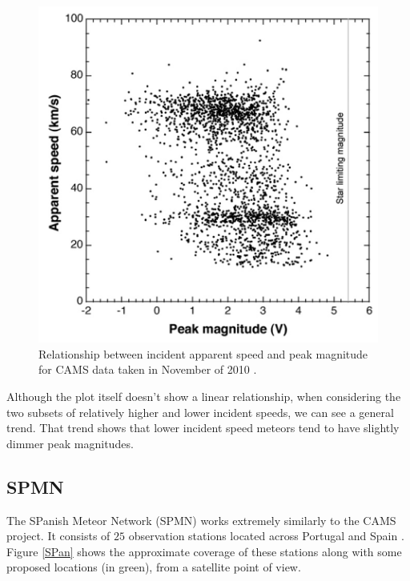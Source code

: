 \begin{figure}[ht!]
  \centering
  \includegraphics[scale=0.6]{images/CAMS_plot.png}
  \caption{Relationship between incident apparent speed and peak magnitude for CAMS data taken in November of 2010 \cite{jenniskens_cams:_2011}.}
  \label{fancyCAMS}
\end{figure}


Although the plot itself doesn't show a linear relationship, when considering the two subsets of relatively higher and lower incident speeds, we can see a general trend.
That trend shows that lower incident speed meteors tend to have slightly dimmer peak magnitudes. 



\subsection{SPMN}

The SPanish Meteor Network (SPMN) works extremely similarly to the CAMS project.  
It consists of $25$ observation stations located across Portugal and Spain \cite{trigo-rodriguez_2006_2007}.
Figure \ref{SPan} shows the approximate coverage of these stations along with some proposed locations (in green), from a satellite point of view.  

